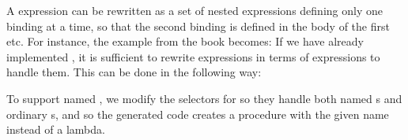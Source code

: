 \begin{exe}[4.7]
    \label{4.7}
    A  expression can be rewritten as a set of nested  
    expressions defining only one binding at a time, so that the second binding 
    is defined in the body of the first  etc. For instance, the 
    example from the book becomes:
    If we have already implemented , it is sufficient to rewrite 
     expressions in terms of  expressions to handle them. 
    This can be done in the following way:
\end{exe}

\begin{exe}[4.8]
    \label{4.8}
    To support named , we modify the selectors for  so they 
    handle both named s and ordinary s, and 
     so the generated code creates a procedure with the 
    given name instead of a lambda.
\end{exe}

